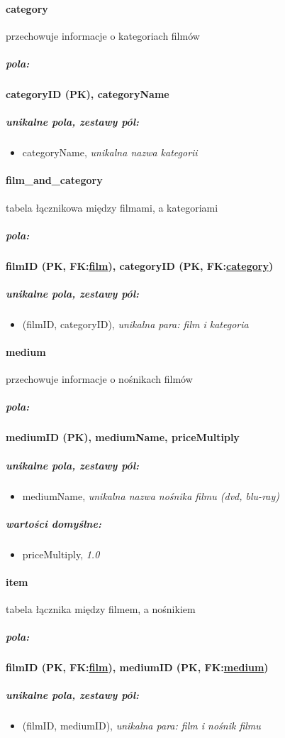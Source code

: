 \documentclass[12pt,a4paper,titlepage]{article}
\begin{document}
\paragraph{category} przechowuje informacje o kategoriach filmów
\subparagraph{pola:}
\textbf{categoryID (PK), categoryName}
\subparagraph{unikalne pola, zestawy pól:}
\begin{itemize}
	\item categoryName, \textit{unikalna nazwa kategorii}
\end{itemize}

\paragraph{film\_and\_category} tabela łącznikowa między filmami, a kategoriami
\subparagraph{pola:}
\textbf{filmID (PK, FK:\underline{film}), categoryID (PK, FK:\underline{category})}
\subparagraph{unikalne pola, zestawy pól:}
\begin{itemize}
	\item (filmID, categoryID), \textit{unikalna para: film i kategoria}
\end{itemize}

\newpage

\paragraph{medium} przechowuje informacje o nośnikach filmów
\subparagraph{pola:}
\textbf{mediumID (PK), mediumName, priceMultiply}
\subparagraph{unikalne pola, zestawy pól:}
\begin{itemize}
	\item mediumName, \textit{unikalna nazwa nośnika filmu (dvd, blu-ray)}
\end{itemize}
\subparagraph{wartości domyślne:}
\begin{itemize}
	\item priceMultiply, \textit{1.0}
\end{itemize}

\paragraph{item} tabela łącznika między filmem, a nośnikiem
\subparagraph{pola:}
\textbf{filmID (PK, FK:\underline{film}), mediumID (PK, FK:\underline{medium})}
\subparagraph{unikalne pola, zestawy pól:}
\begin{itemize}
	\item (filmID, mediumID), \textit{unikalna para: film i nośnik filmu}
\end{itemize}
\end{document}
